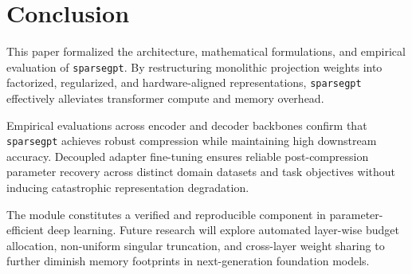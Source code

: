\section{Conclusion}
This paper formalized the architecture, mathematical formulations, and empirical evaluation of \texttt{sparsegpt}. By restructuring monolithic projection weights into factorized, regularized, and hardware-aligned representations, \texttt{sparsegpt} effectively alleviates transformer compute and memory overhead.

Empirical evaluations across encoder and decoder backbones confirm that \texttt{sparsegpt} achieves robust compression while maintaining high downstream accuracy. Decoupled adapter fine-tuning ensures reliable post-compression parameter recovery across distinct domain datasets and task objectives without inducing catastrophic representation degradation.

The module constitutes a verified and reproducible component in parameter-efficient deep learning. Future research will explore automated layer-wise budget allocation, non-uniform singular truncation, and cross-layer weight sharing to further diminish memory footprints in next-generation foundation models.
